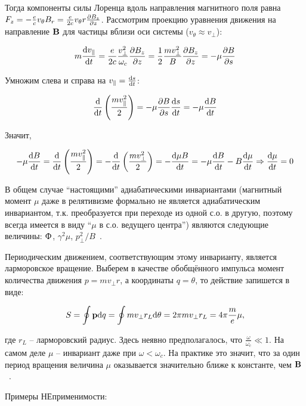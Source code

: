 \documentclass[10pt, a4paper]{article}
\begin{document}
Тогда компоненты силы Лоренца вдоль направления магнитного поля равна $F_z=-\frac{e}{c}v_\theta B_r = \frac{e}{2c}v_\theta r\pdv{B_z}{z}$. Рассмотрим проекцию уравнения движения на направление $\vb{B}$ для частицы вблизи оси системы ($v_\theta\approx v_\perp$):

\begin{equation*}
	m\dv{v_\parallel}{t} = \frac{e}{2c}\frac{v_\perp^2}{\omega_c} \pdv{B_z}{z}= \frac{1}{2}\frac{mv_\perp^2}{B} \pdv{B_z}{z}=-\mu\pdv{B}{s}
\end{equation*}

Умножим слева и справа на $v_\parallel=\dv{s}{t}$:

\begin{equation*}
	\dv{}{t}\left(\frac{mv_\parallel^2}{2}\right)=-\mu\pdv{B}{s}\dv{s}{t}=-\mu\dv{B}{t}
\end{equation*}

Значит, 

\begin{equation*}
	-\mu\dv{B}{t} = \dv{}{t}\left(\frac{mv_\parallel^2}{2}\right) = -\dv{}{t}\left(\frac{mv_\perp^2}{2}\right)=-\dv{\mu B}{t} = -\mu\dv{B}{t}-B\dv{\mu}{t}\Rightarrow \dv{\mu}{t}=0
\end{equation*}

В общем случае ``настоящими'' адиабатическими инвариантами (магнитный момент $\mu$ даже в релятивизме формально не является адиабатическим инвариантом, т.к. преобразуется при переходе из одной с.о. в другую, поэтому всегда имеется в виду ``$\mu$ в с.о. ведущего центра'') являются следующие величины: $\Upphi$, $\gamma^2 \mu$, $p_{\perp}^2/B$~\cite{kotelnikov}.

Периодическим движением, соответствующим этому инварианту, является ларморовское вращение. Выберем в качестве обобщённого импульса момент количества движения $p=mv_\perp r$, а координаты $q=\theta$, то действие запишется в виде:

\begin{equation*}
	S=\oint\vb{p}\dd q = \oint mv_\perp r_{L} \dd\theta = 2\pi mv_\perp r_{L} = 4\pi\frac{m}{e}\mu,
\end{equation*} 

где $r_L$ -- ларморовский радиус. Здесь неявно предполагалось, что $\frac{\omega}{\omega_c}\ll 1$. На самом деле $\mu$ -- инвариант даже при $\omega<\omega_c$. На практике это значит, что за один период вращения величина $\mu$ оказывается значительно ближе к константе, чем $\vb{B}$~\cite{chen}.

Примеры НЕприменимости:
\end{document}

